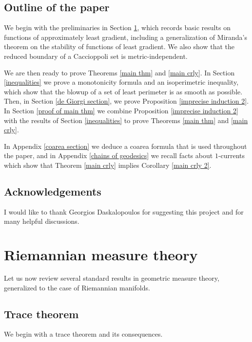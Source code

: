 \documentclass[reqno,12pt,letterpaper]{amsart}
\theoremstyle{definition}
\numberwithin{equation}{section}
\begin{document}

\subsection{Outline of the paper}
We begin with the preliminaries in Section \ref{RiemMeasureThy}, which records basic results on functions of approximately least gradient, including a generalization of Miranda's theorem \cite[Teorema 3]{Miranda67} on the stability of functions of least gradient.
We also show that the reduced boundary of a Caccioppoli set is metric-independent.

We are then ready to prove Theorems \ref{main thm} and \ref{main crly}.
In Section \ref{inequalities} we prove a monotonicity formula and an isoperimetric inequality, which show that the blowup of a set of least perimeter is as smooth as possible.
Then, in Section \ref{de Giorgi section}, we prove Proposition \ref{imprecise induction 2}.
In Section \ref{proof of main thm} we combine Proposition \ref{imprecise induction 2} with the results of Section \ref{inequalities} to prove Theorems \ref{main thm} and \ref{main crly}.

In Appendix \ref{coarea section} we deduce a coarea formula that is used throughout the paper, and in Appendix \ref{chains of geodesics} we recall facts about $1$-currents which show that Theorem \ref{main crly} implies Corollary \ref{main crly 2}.


\subsection{Acknowledgements}
I would like to thank Georgios Daskalopoulos for suggesting this project and for many helpful discussions.


\section{Riemannian measure theory}\label{RiemMeasureThy}
Let us now review several standard results in geometric measure theory, generalized to the case of Riemannian manifolds.

\subsection{Trace theorem}
We begin with a trace theorem and its consequences.
\end{document}
